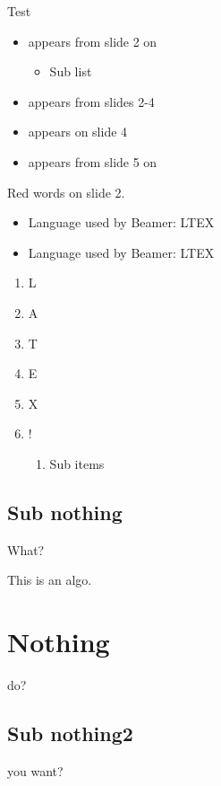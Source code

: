 \documentclass{mySlides}
\begin{document}
\begin{frame}{Test}
    \begin{itemize}
        \item<2-> appears from slide 2 on
        \begin{itemize}
            \item Sub list
        \end{itemize}
        \item<2-4> appears from slides 2-4
        \item<4> appears on slide 4
        \item<5-> appears from slide 5 on
    \end{itemize}


     
    \alert<2>{Red words on slide 2.}  %


    \begin{itemize}
        \item Language used by Beamer: LTEX
        \item Language used by Beamer: LTEX
    \end{itemize}

    \begin{enumerate}[<+-| alert@+>]
        \item L
        \item A
        \item T
        \item E
        \item X
        \item !
        \begin{enumerate}
            \item Sub items
        \end{enumerate}
    \end{enumerate}
\end{frame}

\subsection{Sub nothing}
\begin{frame}{What?}
    \begin{algo}
        This is an algo.
    \end{algo}
\end{frame}

\section{Nothing}
\begin{frame}{do?}
\end{frame}

\subsection{Sub nothing2}
\begin{frame}{you want?}
\end{frame}


\end{document}
